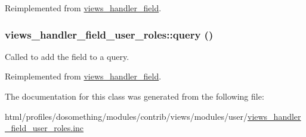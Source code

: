 Reimplemented from \hyperlink{classviews__handler__field_aff134f525e1f83271183939fda4cd0e8}{views\_\-handler\_\-field}.\hypertarget{classviews__handler__field__user__roles_a26513786d88b63b1e2dcfd4aa09c4552}{
\subsubsection[{query}]{\setlength{\rightskip}{0pt plus 5cm}views\_\-handler\_\-field\_\-user\_\-roles::query ()}}
\label{classviews__handler__field__user__roles_a26513786d88b63b1e2dcfd4aa09c4552}
Called to add the field to a query. 

Reimplemented from \hyperlink{classviews__handler__field_a4f661f91bcbe80d4a00c30a31456c502}{views\_\-handler\_\-field}.

The documentation for this class was generated from the following file:\begin{DoxyCompactItemize}
\item 
html/profiles/dosomething/modules/contrib/views/modules/user/\hyperlink{views__handler__field__user__roles_8inc}{views\_\-handler\_\-field\_\-user\_\-roles.inc}\end{DoxyCompactItemize}
